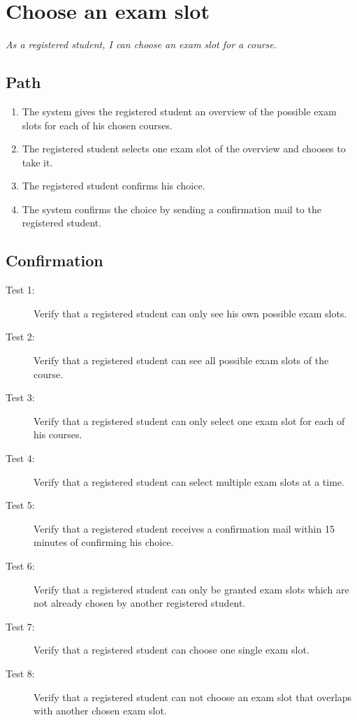 \section{Choose an exam slot}

\par \emph{As a registered student, I can choose an exam slot for a course.}

\subsection{Path}

\begin{enumerate}
  \item The system gives the registered student an overview of the possible exam
  slots for each of his chosen courses.
  \item The registered student selects one exam slot of the overview and chooses
  to take it.
  \item The registered student confirms his choice.
  \item The system confirms the choice by sending a confirmation mail to the
  registered student.
\end{enumerate}

\subsection{Confirmation}

\begin{description}
\item[Test 1:] Verify that a registered student can only see his own possible
exam slots.
\item[Test 2:] Verify that a registered student can see all possible
exam slots of the course.
\item[Test 3:] Verify that a registered student can only select one exam slot
for each of his courses.
\item[Test 4:] Verify that a registered student can select multiple exam slots
at a time.
\item[Test 5:] Verify that a registered student receives a confirmation mail
within 15 minutes of confirming his choice.
\item[Test 6:] Verify that a registered student can only be granted exam slots
which are not already chosen by another registered student.
\item[Test 7:] Verify that a registered student can choose one single exam slot.
\item[Test 8:] Verify that a registered student can not choose an exam slot that
overlaps with another chosen exam slot.
\end{description}